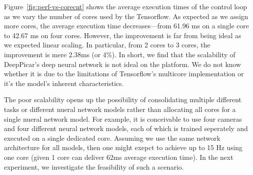 Figure~\ref{fig:perf-vs-corecnt} shows the average execution times of
the control loop as we vary the number of cores used by the
Tensorflow. As expected as we assign more cores, the average execution
time decreases---from 61.96 ms on a single core to 42.67 ms on four
cores. However, the improvement is far from being ideal as we expected
linear scaling. In particular, from 2 cores to 3 cores, the
improvement is mere 2.38ms (or 4\%). In short, we find that the
scalability of DeepPicar's deep neural network is not ideal on the
platform. We do not know whether it is due to the limitations of
Tensorflow's multicore implementation or it's the model's inherent
characteristics. 

The poor scalability opens up the possibility of consolidating
multiple different tasks or different nueral network models rather
than allocating all cores for a single nueral network model. For
example, it is conceivable to use four cameras and four different
neural network models, each of which is trained seperately and
executed on a single dedicated core. Assuming we use the same network
architecture for all models, then one might exepct to achieve up to
15 Hz using one core (given 1 core can deliver 62ms average
execution time). In the next experiment, we investigate the
feasibility of such a scenario.



